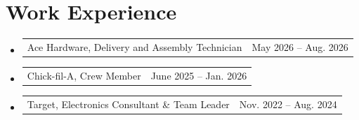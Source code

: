 \documentclass[letterpaper,11pt]{article}
\makeatletter
\newcommand{\resumeItem}[1]{
\item\small{#1 \vspace{-2pt}}
}
\newcommand{\resumeSubheadingSoftTwo}[2]{
\vspace{-8pt}\item
\begin{tabular*}{\textwidth}{l@{\extracolsep{\fill}}r}
#1 & #2 \\
\end{tabular*}\vspace{-20pt}
}
\newcommand{\resumeSubHeadingListStart}{\begin{itemize}[leftmargin=0.15in, label={}]}
\newcommand{\resumeSubHeadingListEnd}{\end{itemize}}
\newcommand{\resumeItemListStart}{\begin{itemize}[leftmargin=0.15in]}
\newcommand{\resumeItemListEnd}{\end{itemize}\vspace{-5pt}}
\makeatother
\begin{document}
\section{Work Experience}
\resumeSubHeadingListStart
\resumeSubheadingSoftTwo{Ace Hardware, Delivery and Assembly Technician}{May 2026 -- Aug. 2026}


\resumeSubheadingSoftTwo{Chick-fil-A, Crew Member}{June 2025 -- Jan. 2026}


\resumeSubheadingSoftTwo{Target, Electronics Consultant \& Team Leader}{Nov. 2022 -- Aug. 2024}

\resumeSubHeadingListEnd
\end{document}
